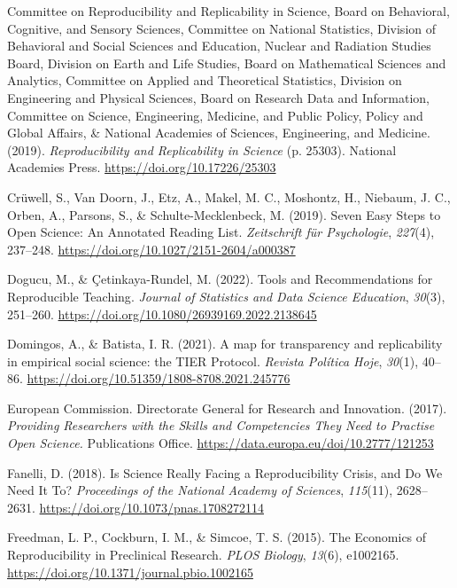 \documentclass[
  a4paper,
]{book}
\newlength{\cslhangindent}
\newenvironment{CSLReferences}[2] %
 {\begin{list}{}{%
  \setlength{\itemindent}{0pt}
  \setlength{\leftmargin}{0pt}
  \setlength{\parsep}{0pt}
  \ifodd #1
   \setlength{\leftmargin}{\cslhangindent}
   \setlength{\itemindent}{-1\cslhangindent}
  \fi
  \setlength{\itemsep}{#2\baselineskip}}}
 {\end{list}}
\begin{document}
\begin{CSLReferences}{1}{0}
Committee on Reproducibility and Replicability in Science, Board on
Behavioral, Cognitive, and Sensory Sciences, Committee on National
Statistics, Division of Behavioral and Social Sciences and Education,
Nuclear and Radiation Studies Board, Division on Earth and Life Studies,
Board on Mathematical Sciences and Analytics, Committee on Applied and
Theoretical Statistics, Division on Engineering and Physical Sciences,
Board on Research Data and Information, Committee on Science,
Engineering, Medicine, and Public Policy, Policy and Global Affairs, \&
National Academies of Sciences, Engineering, and Medicine. (2019).
\emph{Reproducibility and {Replicability} in {Science}} (p. 25303).
National Academies Press. \url{https://doi.org/10.17226/25303}

Crüwell, S., Van Doorn, J., Etz, A., Makel, M. C., Moshontz, H.,
Niebaum, J. C., Orben, A., Parsons, S., \& Schulte-Mecklenbeck, M.
(2019). Seven {Easy Steps} to {Open Science}: {An Annotated Reading
List}. \emph{Zeitschrift f{ü}r Psychologie}, \emph{227}(4), 237--248.
\url{https://doi.org/10.1027/2151-2604/a000387}

Dogucu, M., \& Çetinkaya-Rundel, M. (2022). Tools and {Recommendations}
for {Reproducible Teaching}. \emph{Journal of Statistics and Data
Science Education}, \emph{30}(3), 251--260.
\url{https://doi.org/10.1080/26939169.2022.2138645}

Domingos, A., \& Batista, I. R. (2021). A map for transparency and
replicability in empirical social science: the TIER Protocol.
\emph{Revista Política Hoje}, \emph{30}(1), 40--86.
\url{https://doi.org/10.51359/1808-8708.2021.245776}

European Commission. Directorate General for Research and Innovation.
(2017). \emph{Providing Researchers with the Skills and Competencies
They Need to Practise {Open Science}.} Publications Office.
\url{https://data.europa.eu/doi/10.2777/121253}

Fanelli, D. (2018). Is Science Really Facing a Reproducibility Crisis,
and Do We Need It To? \emph{Proceedings of the National Academy of
Sciences}, \emph{115}(11), 2628--2631.
\url{https://doi.org/10.1073/pnas.1708272114}

Freedman, L. P., Cockburn, I. M., \& Simcoe, T. S. (2015). The
{Economics} of {Reproducibility} in {Preclinical Research}. \emph{PLOS
Biology}, \emph{13}(6), e1002165.
\url{https://doi.org/10.1371/journal.pbio.1002165}


\end{CSLReferences}
\end{document}

